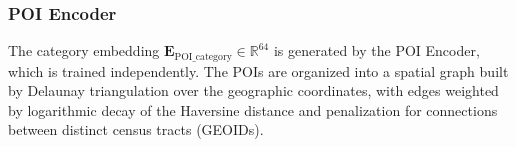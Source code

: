 \subsubsection{POI Encoder}

The category embedding $\mathbf{E}_{\text{POI\_category}} \in \mathbb{R}^{64}$ is generated by the POI Encoder, which is trained independently. The POIs are organized into a spatial graph
built by Delaunay triangulation over the geographic coordinates, with edges weighted by
logarithmic decay of the Haversine distance and penalization for connections between distinct
census tracts (GEOIDs).

